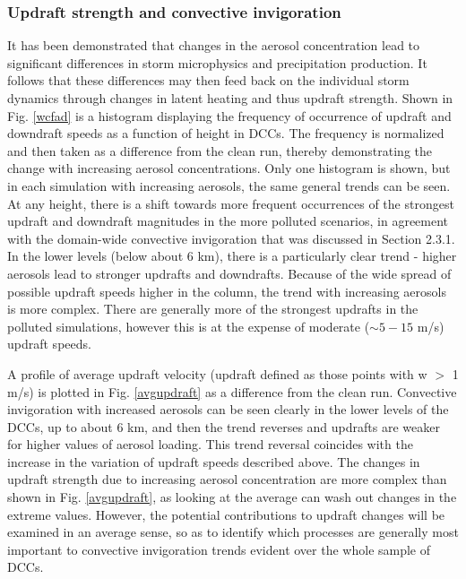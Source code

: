 \subsubsection{Updraft strength and convective invigoration}

It has been demonstrated that changes in the aerosol concentration lead to significant differences in storm microphysics and precipitation production.  It follows that these differences may then feed back on the individual storm dynamics through changes in latent heating and thus updraft strength.  Shown in Fig. \ref{wcfad} is a histogram displaying the frequency of occurrence of updraft and downdraft speeds as a function of height in DCCs.  The frequency is normalized and then taken as a difference from the clean run, thereby demonstrating the change with increasing aerosol concentrations.  Only one histogram is shown, but in each simulation with increasing aerosols, the same general trends can be seen.  At any height, there is a shift towards more frequent occurrences of the strongest updraft and downdraft magnitudes in the more polluted scenarios, in agreement with the domain-wide convective invigoration that was discussed in Section 2.3.1.  In the lower levels (below about 6 km), there is a particularly clear trend - higher aerosols lead to stronger updrafts and downdrafts.  Because of the wide spread of possible updraft speeds higher in the column, the trend with increasing aerosols is more complex.  There are generally more of the strongest updrafts in the polluted simulations, however this is at the expense of moderate ($\sim 5-15$ m/s) updraft speeds.

A profile of average updraft velocity (updraft defined as those points with w $> $ 1 m/s) is plotted in Fig. \ref{avgupdraft} as a difference from the clean run.  Convective invigoration with increased aerosols can be seen clearly in the lower levels of the DCCs, up to about 6 km, and then the trend reverses and updrafts are weaker for higher values of aerosol loading.  This trend reversal coincides with the increase in the variation of updraft speeds described above.  The changes in updraft strength due to increasing aerosol concentration are more complex than shown in Fig. \ref{avgupdraft}, as looking at the average can wash out changes in the extreme values.  However, the potential contributions to updraft changes will be examined in an average sense, so as to identify which processes are generally most important to convective invigoration trends evident over the whole sample of DCCs.

